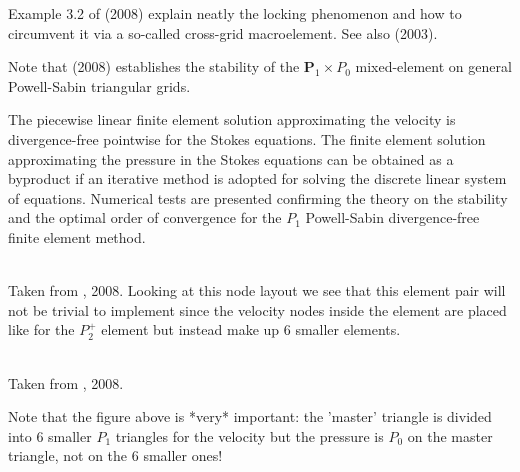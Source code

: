 Example 3.2 of \textcite{bobf08} (2008) explain neatly the locking phenomenon and how 
to circumvent it via a so-called cross-grid macroelement. See also 
\textcite{hokl03} (2003).

Note that \textcite{zhan08} (2008) establishes the stability of the ${\bm P}_1\times P_0$
mixed-element on general Powell-Sabin triangular grids.

\begin{displayquote}
{\color{darkgray}
The piecewise linear finite element solution approximating the velocity is
divergence-free pointwise for the Stokes equations. The finite element solution approximating 
the pressure in the Stokes equations can be obtained as a byproduct if an iterative
method is adopted for solving the discrete linear system of equations. Numerical tests are
presented confirming the theory on the stability and the optimal order of convergence for
the $P_1$ Powell-Sabin divergence-free finite element method.}
\end{displayquote}

\begin{center}
\\
{\captionfont Taken from \textcite{zhan08}, 2008. Looking at this node layout we see that 
this element pair will not be trivial to implement since the velocity nodes inside the element
are placed like for the $P_2^+$ element but instead make up 6 smaller elements.}
\end{center}

\begin{center}
\\
{\captionfont Taken from \textcite{zhan08}, 2008.}
\end{center}
Note that the figure above is *very* important: the 'master' triangle is divided into
6 smaller $P_1$ triangles for the velocity but the pressure is $P_0$ on the master triangle, 
not on the 6 smaller ones!

